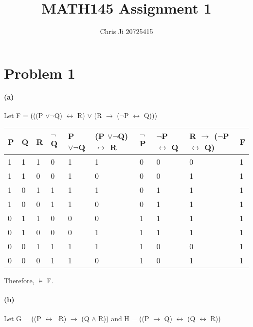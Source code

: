 \documentclass[10pt,letter]{article}
\begin{document}
\title{MATH145 Assignment 1}
\author{Chris Ji 20725415}

\maketitle 

\section*{Problem 1}

\paragraph{(a)} 
Let F = (((P $\vee \neg$Q) $\leftrightarrow$ R) $\vee$ (R $\rightarrow$ ($\neg$P $\leftrightarrow$ Q)))
\begin {center}
\begin{tabular}{|l|l|l|l|l|l|l|l|l|l|}
\hline
P & Q & R & $\neg$Q & P $\vee \neg$Q & (P $\vee \neg$Q) $\leftrightarrow$ R & $\neg$P & $\neg$P $\leftrightarrow$ Q & R $\rightarrow$ ($\neg$P $\leftrightarrow$ Q) & F \\ \hline
1 & 1 & 1 & 0 & 1 & 1 & 0 & 0 & 0 & 1 \\
1 & 1 & 0 & 0 & 1 & 0 & 0 & 0 & 1 & 1 \\
1 & 0 & 1 & 1 & 1 & 1 & 0 & 1 & 1 & 1 \\
1 & 0 & 0 & 1 & 1 & 0 & 0 & 1 & 1 & 1 \\
0 & 1 & 1 & 0 & 0 & 0 & 1 & 1 & 1 & 1 \\
0 & 1 & 0 & 0 & 0 & 1 & 1 & 1 & 1 & 1 \\
0 & 0 & 1 & 1 & 1 & 1 & 1 & 0 & 0 & 1 \\
0 & 0 & 0 & 1 & 1 & 0 & 1 & 0 & 1 & 1 \\
\hline
\end{tabular}
\end{center}

Therefore, $\models$ F.

\paragraph{(b)} 
Let G = ((P $\leftrightarrow \neg$R) $\rightarrow$ (Q $\wedge$ R)) and H = ((P $\rightarrow$ Q) $\leftrightarrow$ (Q $\leftrightarrow$ R))
\end{document}
